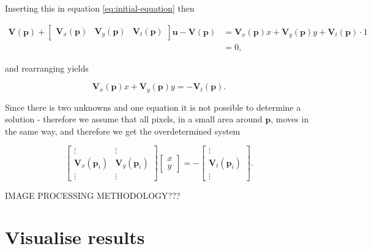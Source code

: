 \documentclass{article}
\begin{document}
Inserting this in equation \ref{eq:initial-equation} then

\begin{equation}
    \begin{split}
        \boldsymbol{V(p)} + \begin{bmatrix}
        \boldsymbol{V}_x(\boldsymbol{p}) & \boldsymbol{V}_y(\boldsymbol{p}) & \boldsymbol{V}_t(\boldsymbol{p})
        \end{bmatrix} \boldsymbol{u} - \boldsymbol{V(p)} &= \boldsymbol{V}_x(\boldsymbol{p}) x + \boldsymbol{V}_y(\boldsymbol{p}) y + \boldsymbol{V}_t(\boldsymbol{p}) \cdot 1 \\
        &= 0,
    \end{split}
\end{equation}

and rearranging yields

\begin{equation}
    \boldsymbol{V}_x(\boldsymbol{p}) x + \boldsymbol{V}_y(\boldsymbol{p}) y = -\boldsymbol{V}_t(\boldsymbol{p}).
\end{equation}

Since there is two unknowns and one equation it is not possible to determine a solution - therefore we assume that all pixels, in a small area around $\boldsymbol{p}$, moves in the same way, and therefore we get the overdetermined system

\begin{equation}
    \begin{bmatrix}
        \vdots & \vdots \\
        \boldsymbol{V}_x(\boldsymbol{p}_i) & \boldsymbol{V}_y(\boldsymbol{p}_i) \\
        \vdots & \vdots
    \end{bmatrix} \begin{bmatrix}
        x \\ y
    \end{bmatrix}
    = - \begin{bmatrix}
        \vdots \\ \boldsymbol{V}_t(\boldsymbol{p}_i) \\ \vdots
    \end{bmatrix}.
\end{equation}

IMAGE PROCESSING METHODOLOGY???

\section{Visualise results}
\end{document}
